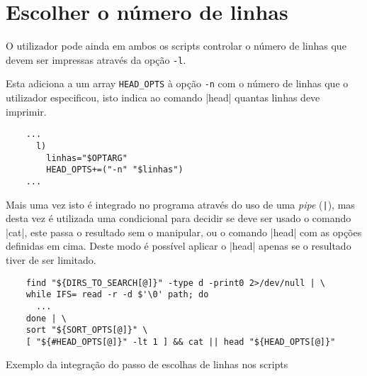 \section{Escolher o número de linhas}

O utilizador pode ainda em ambos os scripts controlar o número de linhas que
devem ser impressas através da opção \Verb|-l|.

Esta adiciona a um array \Verb|HEAD_OPTS| à opção \Verb|-n| com o número de
linhas que o utilizador especificou, isto indica ao comando \bashinline|head|
quantas linhas deve imprimir.

\begin{listing}[H]
	\centering
	\begin{verbatim}
    ...
      l)
        linhas="$OPTARG"
        HEAD_OPTS+=("-n" "$linhas")
    ...
  \end{verbatim}
	\cprotect\caption{Processamento da opção \Verb|-l|}
\end{listing}

Mais uma vez isto é integrado no programa através do uso de uma \emph{pipe}
(\Verb_|_), mas desta vez é utilizada uma condicional para decidir se deve ser
usado o comando \bashinline|cat|, este passa o resultado sem o manipular,
ou o comando \bashinline|head| com as opções definidas em cima. Deste modo é
possível aplicar o \bashinline|head| apenas se o resultado tiver de ser limitado.

\begin{listing}[H]
	\centering
	\begin{verbatim}
    find "${DIRS_TO_SEARCH[@]}" -type d -print0 2>/dev/null | \
    while IFS= read -r -d $'\0' path; do
      ...
    done | \
    sort "${SORT_OPTS[@]}" \
    [ "${#HEAD_OPTS[@]}" -lt 1 ] && cat || head "${HEAD_OPTS[@]}"
  \end{verbatim}
	\caption{Exemplo da integração do passo de escolhas de linhas nos scripts}
\end{listing}
